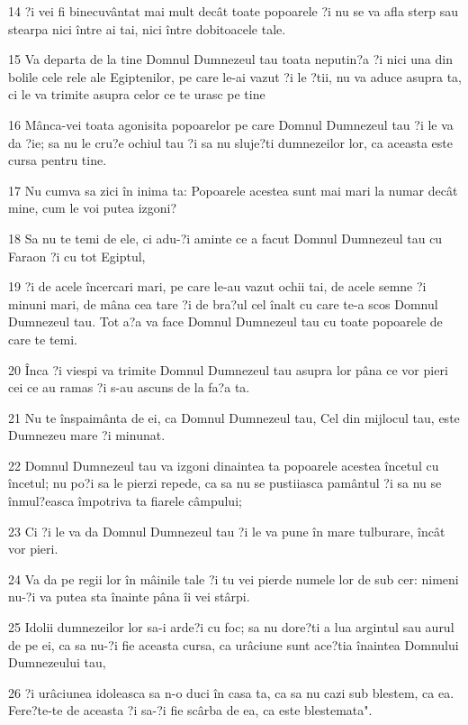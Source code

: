 \par 14 ?i vei fi binecuvântat mai mult decât toate popoarele ?i nu se va afla sterp sau stearpa nici între ai tai, nici între dobitoacele tale.
\par 15 Va departa de la tine Domnul Dumnezeul tau toata neputin?a ?i nici una din bolile cele rele ale Egiptenilor, pe care le-ai vazut ?i le ?tii, nu va aduce asupra ta, ci le va trimite asupra celor ce te urasc pe tine
\par 16 Mânca-vei toata agonisita popoarelor pe care Domnul Dumnezeul tau ?i le va da ?ie; sa nu le cru?e ochiul tau ?i sa nu sluje?ti dumnezeilor lor, ca aceasta este cursa pentru tine.
\par 17 Nu cumva sa zici în inima ta: Popoarele acestea sunt mai mari la numar decât mine, cum le voi putea izgoni?
\par 18 Sa nu te temi de ele, ci adu-?i aminte ce a facut Domnul Dumnezeul tau cu Faraon ?i cu tot Egiptul,
\par 19 ?i de acele încercari mari, pe care le-au vazut ochii tai, de acele semne ?i minuni mari, de mâna cea tare ?i de bra?ul cel înalt cu care te-a scos Domnul Dumnezeul tau. Tot a?a va face Domnul Dumnezeul tau cu toate popoarele de care te temi.
\par 20 Înca ?i viespi va trimite Domnul Dumnezeul tau asupra lor pâna ce vor pieri cei ce au ramas ?i s-au ascuns de la fa?a ta.
\par 21 Nu te înspaimânta de ei, ca Domnul Dumnezeul tau, Cel din mijlocul tau, este Dumnezeu mare ?i minunat.
\par 22 Domnul Dumnezeul tau va izgoni dinaintea ta popoarele acestea încetul cu încetul; nu po?i sa le pierzi repede, ca sa nu se pustiiasca pamântul ?i sa nu se înmul?easca împotriva ta fiarele câmpului;
\par 23 Ci ?i le va da Domnul Dumnezeul tau ?i le va pune în mare tulburare, încât vor pieri.
\par 24 Va da pe regii lor în mâinile tale ?i tu vei pierde numele lor de sub cer: nimeni nu-?i va putea sta înainte pâna îi vei stârpi.
\par 25 Idolii dumnezeilor lor sa-i arde?i cu foc; sa nu dore?ti a lua argintul sau aurul de pe ei, ca sa nu-?i fie aceasta cursa, ca urâciune sunt ace?tia înaintea Domnului Dumnezeului tau,
\par 26 ?i urâciunea idoleasca sa n-o duci în casa ta, ca sa nu cazi sub blestem, ca ea. Fere?te-te de aceasta ?i sa-?i fie scârba de ea, ca este blestemata".

